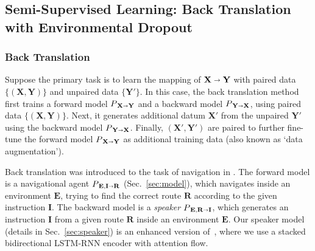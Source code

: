 \documentclass[11pt,a4paper]{article}
\begin{document}
\subsection{Semi-Supervised Learning: Back Translation with Environmental Dropout}
\label{sec:ssl}


\subsubsection{Back Translation}  
\label{sec:back_translation}
Suppose the primary task is to learn the mapping of $\mathbf X \shortrightarrow \mathbf Y$ with paired data $\{(\mathbf X, \mathbf Y)\}$ and unpaired data $\{\mathbf{Y'}\}$.
In this case, the back translation method first trains a forward model $P_{\,\mathbf X \shortrightarrow \mathbf Y}$ and a backward model $P_{\,\mathbf Y \shortrightarrow \mathbf X}$, using paired data $\{(\mathbf X, \mathbf Y)\}$.
Next, it generates additional datum $\mathbf{X'}$ from the unpaired $\mathbf{Y'}$ using the backward model $P_{\,\mathbf Y \shortrightarrow \mathbf X}$.
Finally, $(\mathbf{X'}, \mathbf{Y'})$ are paired to further fine-tune the forward model $P_{\,\mathbf X \shortrightarrow \mathbf Y}$ as additional training data (also known as `data augmentation').

Back translation was introduced to the task of navigation in . 
The forward model is a navigational agent $P_{\,\mathbf{E}, \mathbf{I} \shortrightarrow \mathbf R}$ (Sec.~\ref{sec:model}), which navigates inside an environment $\mathbf E$, trying to find the correct route $\mathbf R$ according to the given instruction $\mathbf I$.
The backward model is a \emph{speaker} $P_{\,\mathbf E, \mathbf R \shortrightarrow \mathbf{I}}$, 
which generates an instruction $\mathbf I$ from a given route $\mathbf R$ inside an environment $\mathbf{E}$. 
Our speaker model (details in Sec.~\ref{sec:speaker}) is an enhanced version of~, where we use a stacked bidirectional LSTM-RNN encoder with attention flow.
\end{document}
